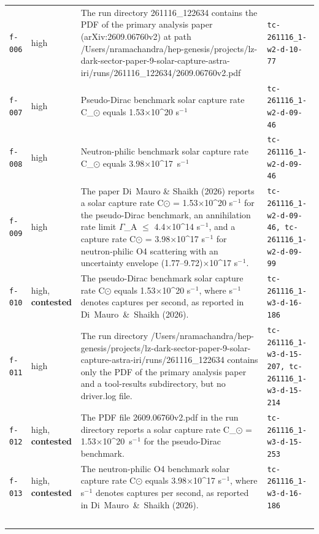 \documentclass[11pt,a4paper]{article}
\begin{document}
\begin{longtable}{@{}p{}p{}p{}p{}@{}}
\texttt{f-006} & high & The run directory 261116\_122634 contains the PDF of the primary analysis paper (arXiv:2609.06760v2) at path /Users/nramachandra/hep-genesis/projects/lz-dark-sector-paper-9-solar-capture-astra-iri/runs/261116\_122634/2609.06760v2.pdf & \texttt{tc-261116\_\allowbreak{}1-w2-d-10-77} \\
\texttt{f-007} & high & Pseudo-Dirac benchmark solar capture rate C\_$\odot$ equals 1.53$\times$10\textasciicircum{}20 s$^-$$^1$ & \texttt{tc-261116\_\allowbreak{}1-w2-d-09-46} \\
\texttt{f-008} & high & Neutron-philic benchmark solar capture rate C\_$\odot$ equals 3.98$\times$10\textasciicircum{}17~s$^-$$^1$ & \texttt{tc-261116\_\allowbreak{}1-w2-d-09-46} \\
\texttt{f-009} & high & The paper Di~Mauro \& Shaikh (2026) reports a solar capture rate C$\odot$ = 1.53$\times$10\textasciicircum{}20 s$^-$$^1$ for the pseudo-Dirac benchmark, an annihilation rate limit $\Gamma$\_A $\leq$ 4.4$\times$10\textasciicircum{}14 s$^-$$^1$, and a capture rate C$\odot$ = 3.98$\times$10\textasciicircum{}17 s$^-$$^1$ for neutron-philic O4 scattering with an uncertainty envelope (1.77--9.72)$\times$10\textasciicircum{}17 s$^-$$^1$. & \texttt{tc-261116\_\allowbreak{}1-w2-d-09-46,\allowbreak{} tc-261116\_\allowbreak{}1-w2-d-09-99} \\
\texttt{f-010} & high, \textbf{contested} & The pseudo-Dirac benchmark solar capture rate C$\odot$ equals 1.53$\times$10\textasciicircum{}20 s$^-$$^1$, where s$^-$$^1$ denotes captures per second, as reported in Di~Mauro~\&~Shaikh (2026). & \texttt{tc-261116\_\allowbreak{}1-w3-d-16-186} \\
\texttt{f-011} & high & The run directory /Users/nramachandra/hep-genesis/projects/lz-dark-sector-paper-9-solar-capture-astra-iri/runs/261116\_122634 contains only the PDF of the primary analysis paper and a tool-results subdirectory, but no driver.log file. & \texttt{tc-261116\_\allowbreak{}1-w3-d-15-207,\allowbreak{} tc-261116\_\allowbreak{}1-w3-d-15-214} \\
\texttt{f-012} & high, \textbf{contested} & The PDF file 2609.06760v2.pdf in the run directory reports a solar capture rate C\_$\odot$ = 1.53$\times$10\textasciicircum{}20~s$^-$$^1$ for the pseudo-Dirac benchmark. & \texttt{tc-261116\_\allowbreak{}1-w3-d-15-253} \\
\texttt{f-013} & high, \textbf{contested} & The neutron-philic O4 benchmark solar capture rate C$\odot$ equals 3.98$\times$10\textasciicircum{}17 s$^-$$^1$, where s$^-$$^1$ denotes captures per second, as reported in Di~Mauro~\&~Shaikh (2026). & \texttt{tc-261116\_\allowbreak{}1-w3-d-16-186} \\
$$
\end{longtable}
\end{document}
